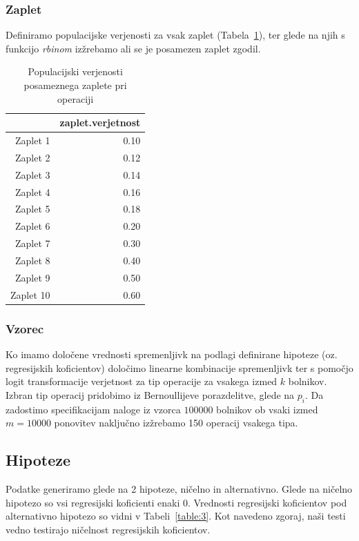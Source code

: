 \documentclass[letterpaper,11pt]{article}
\begin{document}
\subsubsection{Zaplet}
Definiramo populacijske verjenosti za vsak zaplet (Tabela~\ref{table:2}), ter glede na njih s funkcijo \emph{rbinom} izžrebamo ali se je posamezen zaplet zgodil.

\begin{table}[ht]
\centering
\begin{tabular}{rr}
  \hline
 & zaplet.verjetnost \\ 
  \hline
Zaplet 1 & 0.10 \\ 
  Zaplet 2 & 0.12 \\ 
  Zaplet 3 & 0.14 \\ 
  Zaplet 4 & 0.16 \\ 
  Zaplet 5 & 0.18 \\ 
  Zaplet 6 & 0.20 \\ 
  Zaplet 7 & 0.30 \\ 
  Zaplet 8 & 0.40 \\ 
  Zaplet 9 & 0.50 \\ 
  Zaplet 10 & 0.60 \\ 
   \hline
\end{tabular}
\caption{Populacijski verjenosti posameznega zaplete pri operaciji} 
\label{table:2}
\end{table}

\subsubsection{Vzorec}
Ko imamo določene vrednosti spremenljivk na podlagi definirane hipoteze (oz. regresijskih koficientov) določimo linearne kombinacije spremenljivk ter s pomočjo logit transformacije verjetnost za tip operacije za vsakega izmed $k$ bolnikov. Izbran tip operacij pridobimo iz Bernoullijeve porazdelitve, glede na $p_i$. Da zadostimo specifikacijam naloge iz vzorca $100000$ bolnikov ob vsaki izmed $m=10000$ ponovitev naključno izžrebamo 150 operacij vsakega tipa.

\subsection{Hipoteze}
Podatke generiramo glede na 2 hipoteze, ničelno in alternativno. Glede na ničelno hipotezo so vsi regresijski koficienti enaki 0. Vrednosti regresijski koficientov pod alternativno hipotezo so vidni v Tabeli~\ref{table:3}. Kot navedeno zgoraj, naši testi vedno testirajo ničelnost regresijskih koficientov.
\end{document}
